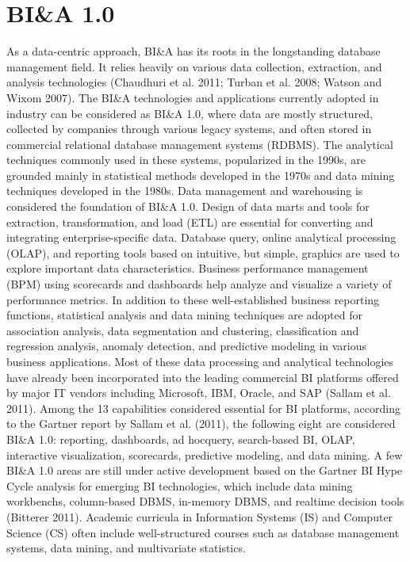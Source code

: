 \section*{BI\&A 1.0}
As a data-centric approach, BI\&A has its roots in the longstanding database management field. It relies heavily on
various data collection, extraction, and analysis technologies
(Chaudhuri et al. 2011; Turban et al. 2008; Watson and
Wixom 2007). The BI\&A technologies and applications
currently adopted in industry can be considered as BI\&A 1.0,
where data are mostly structured, collected by companies
through various legacy systems, and often stored in commercial relational database management systems (RDBMS). The
analytical techniques commonly used in these systems,
popularized in the 1990s, are grounded mainly in statistical
methods developed in the 1970s and data mining techniques
developed in the 1980s. 
Data management and warehousing is considered the foundation of BI\&A 1.0. Design of data marts and tools for
extraction, transformation, and load (ETL) are essential for
converting and integrating enterprise-specific data. Database
query, online analytical processing (OLAP), and reporting
tools based on intuitive, but simple, graphics are used to
explore important data characteristics. Business performance
management (BPM) using scorecards and dashboards help
analyze and visualize a variety of performance metrics. In
addition to these well-established business reporting functions, statistical analysis and data mining techniques are
adopted for association analysis, data segmentation and
clustering, classification and regression analysis, anomaly
detection, and predictive modeling in various business applications. Most of these data processing and analytical technologies have already been incorporated into the leading commercial BI platforms offered by major IT vendors including
Microsoft, IBM, Oracle, and SAP (Sallam et al. 2011). 
Among the 13 capabilities considered essential for BI platforms, according to the Gartner report by Sallam et al. (2011),
the following eight are considered BI\&A 1.0: reporting,
dashboards, ad hocquery, search-based BI, OLAP, interactive
visualization, scorecards, predictive modeling, and data
mining. A few BI\&A 1.0 areas are still under active development based on the Gartner BI Hype Cycle analysis for
emerging BI technologies, which include data mining workbenchs, column-based DBMS, in-memory DBMS, and realtime decision tools (Bitterer 2011). Academic curricula in
Information Systems (IS) and Computer Science (CS) often include well-structured courses such as database management
systems, data mining, and multivariate statistics.


